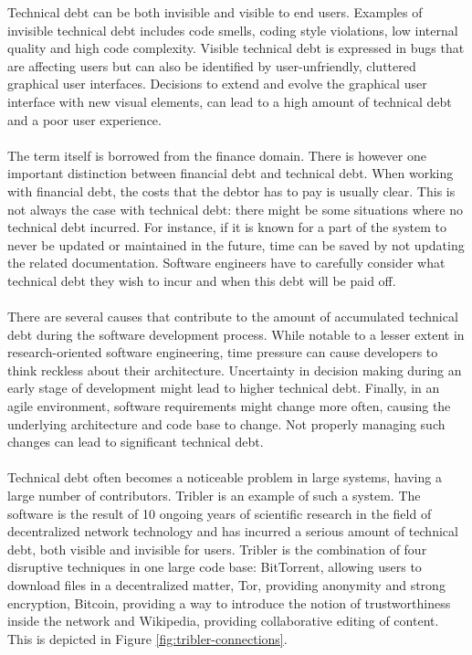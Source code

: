 Technical debt can be both invisible and visible to end users\cite{kruchten2012technical}.
Examples of invisible technical debt includes code smells, coding style violations, low internal quality and high code complexity.
Visible technical debt is expressed in bugs that are affecting users but can also be identified by user-unfriendly, cluttered graphical user interfaces.
Decisions to extend and evolve the graphical user interface with new visual elements, can lead to a high amount of technical debt and a poor user experience.\\\\
The term itself is borrowed from the finance domain\cite{guo2011portfolio}.
There is however one important distinction between financial debt and technical debt.
When working with financial debt, the costs that the debtor has to pay is usually clear.
This is not always the case with technical debt: there might be some situations where no technical debt incurred.
For instance, if it is known for a part of the system to never be updated or maintained in the future, time can be saved by not updating the related documentation.
Software engineers have to carefully consider what technical debt they wish to incur and when this debt will be paid off.\\\\
There are several causes that contribute to the amount of accumulated technical debt during the software development process\cite{martini2014architecture}. While notable to a lesser extent in research-oriented software engineering, time pressure can cause developers to think reckless about their architecture. Uncertainty in  decision making during an early stage of development might lead to higher technical debt. Finally, in an agile environment, software requirements might change more often, causing the underlying architecture and code base to change. Not properly managing such changes can lead to significant technical debt.\\\\
Technical debt often becomes a noticeable problem in large systems, having a large number of contributors. Tribler is an example of such a system. The software is the result of 10 ongoing years of scientific research in the field of decentralized network technology and has incurred a serious amount of technical debt, both visible and invisible for users.
Tribler is the combination of four disruptive techniques in one large code base: BitTorrent, allowing users to download files in a decentralized matter, Tor, providing anonymity and strong encryption, Bitcoin, providing a way to introduce the notion of trustworthiness inside the network and Wikipedia, providing collaborative editing of content. This is depicted in Figure \ref{fig:tribler-connections}.\\

